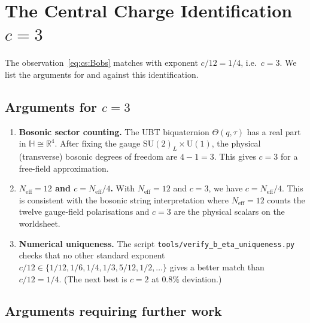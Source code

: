 \documentclass[12pt,a4paper]{article}
\theoremstyle{definition}
\theoremstyle{remark}
\begin{document}
\section{The Central Charge Identification $c = 3$}
\label{sec:cs:centralcharge}

The observation~\eqref{eq:cs:Bobs} matches with exponent $c/12 = 1/4$,
i.e.\ $c = 3$.  We list the arguments for and against this identification.

\subsection{Arguments for $c = 3$}

\begin{enumerate}
  \item \textbf{Bosonic sector counting.}
        The UBT biquaternion $\Theta(q,\tau)$ has a real part in
        $\mathbb{H} \cong \mathbb{R}^4$.  After fixing the gauge
        $\mathrm{SU}(2)_L \times \mathrm{U}(1)$, the physical (transverse)
        bosonic degrees of freedom are $4 - 1 = 3$.  This gives $c = 3$
        for a free-field approximation.

  \item \textbf{$N_{\mathrm{eff}} = 12$ and $c = N_{\mathrm{eff}}/4$.}
        With $N_{\mathrm{eff}} = 12$ and $c = 3$, we have $c = N_{\mathrm{eff}}/4$.
        This is consistent with the bosonic string interpretation where
        $N_{\mathrm{eff}} = 12$ counts the twelve gauge-field polarisations
        and $c = 3$ are the physical scalars on the worldsheet.

  \item \textbf{Numerical uniqueness.}
        The script \texttt{tools/verify\_b\_eta\_uniqueness.py} checks that
        no other standard exponent $c/12 \in \{1/12, 1/6, 1/4, 1/3, 5/12, 1/2,
        \ldots\}$ gives a better match than $c/12 = 1/4$.  (The next best is
        $c = 2$ at $0.8\%$ deviation.)
\end{enumerate}

\subsection{Arguments requiring further work}
\end{document}
